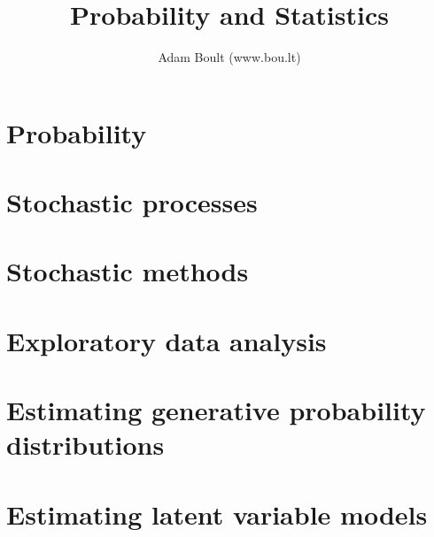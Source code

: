 \documentclass[oneside]{book}
\begin{document}
\author{Adam Boult (www.bou.lt)}
\title{Probability and Statistics}
\maketitle

\setcounter{tocdepth}{1}
\tableofcontents



\part{Probability}











\part{Stochastic processes}






\part{Stochastic methods}




\part{Exploratory data analysis}








\part{Estimating generative probability distributions}












\part{Estimating latent variable models}

\end{document}
